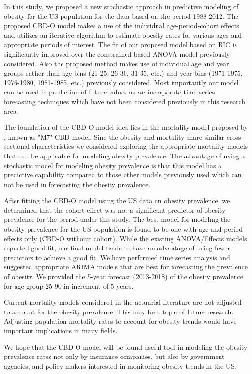 \documentclass[11pt,letterpaper]{article}
\numberwithin{equation}{section}
\begin{document}
 In this study, we proposed a new stochastic approach in predictive modeling of obesity for the US population for the data based on the period 1988-2012. The proposed CBD-O model makes a use of the individual age-period-cohort effects and utilizes an iterative algorithm to estimate obesity rates for various ages and appropriate periods of interest. The fit of our proposed model based on BIC is significantly improved over the constrained-based ANOVA model previously considered. Also the proposed method makes use of individual age and year groups rather than age bins (21-25, 26-30, 31-35, etc.) and year bins (1971-1975, 1976-1980, 1981-1985, etc.) previously considered. Most importantly our model can be used in prediction of future values as we incorporate time series forecasting techniques which have not been considered previously in this research area.

 The foundation of the CBD-O model idea lies in the mortality model proposed by \cite{Cairns+Blake+Dowd+Coughlan+Epstein+Khalaf+Allah:2011}, known as "M7" CBD model. Sine the obesity and mortality share similar cross-sectional characteristics we considered exploring the appropriate mortality models that can be applicable for modeling obesity prevalence. The advantage of using a stochastic model for modeling obesity prevalence is that this model has a predictive capability compared to those other models previously used which can not be used in forecasting the obesity prevalence.

 After fitting the CBD-O model using the US data on obesity prevalence, we determined that the cohort effect was not a significant predictor of obesity prevalence for the period under this study. The best model for modeling the obesity prevalence for the US population is found to be one with age and period effects only (CBD-O withoiut cohort). While the existing ANOVA/Effects models reported good fit, our final model tends to have an advantage of using fewer predictors to achieve a good fit. We have performed time series analysis and suggested appropriate ARIMA models that are best for forecasting the prevalence of obesity. We provided the 5-year forecast (2013-2018) of the obesity prevalence for age group 25-90 in increment of 5 years.

Current mortality models considered in the actuarial literature are not adjusted to account for the obesity prevalence. This may be a topic of future research. Adjusting papulation mortality rates to account for obesity trends would have important implications in many fields.

We hope that the CBD-O model will be found useful tool in modeling the obesity prevalence rates not only by insurance companies, but also by government agencies, and policy makers interested in monitoring obesity trends in the US.



\end{document}
